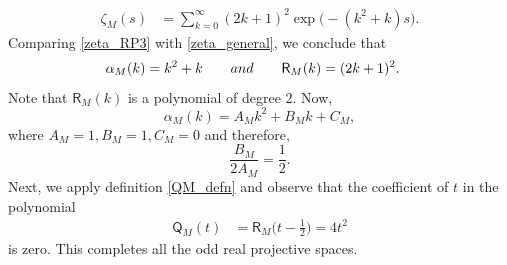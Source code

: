 \documentclass[11pt,lettersize,reqno,fullpage]{amsart}
\begin{document}
\begin{align}
\zeta_{M}(s) & = \sum_{k=0}^{\infty} (2k+1)^2 \exp\Big(-(k^2+k)s\Big). \label{zeta_RP3}
\end{align}
Comparing \eqref{zeta_RP3} with \eqref{zeta_general}, we conclude that 
\begin{align}
\alpha_{M}(k)& = k^2 + k\qquad \textnormal{and} \qquad 
\mathsf{R}_{M}(k) = (2k+1)^2.  
\end{align}
Note that $\mathsf{R}_{M}(k)$ is a polynomial of degree $2$. Now, 
\[\alpha_{M}(k)=A_{M}k^{2}+B_{M}k+C_{M}, \]
where $A_{M}=1, B_{M}=1, C_{M}=0 $ and therefore, 
\[\frac{B_{M}}{2 A_{M}}=\frac{1}{2}. \] 
Next, we apply definition \eqref{QM_defn} and observe that the coefficient of $t$ in the polynomial
\begin{align}
\mathsf{Q}_{M}(t) & = \mathsf{R}_{M}\Big(t-\frac{1}{2}\Big)=4t^{2}
\end{align}
is zero. 
This completes all the odd real projective spaces.  

%
\end{document}
